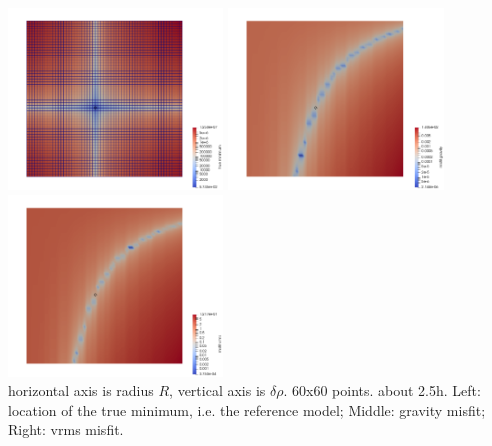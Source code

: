 \begin{center}
\includegraphics[width=5.7cm]{python_codes/fieldstone_114/results/min}
\includegraphics[width=5.7cm]{python_codes/fieldstone_114/results/mg}
\includegraphics[width=5.7cm]{python_codes/fieldstone_114/results/mv}\\
{\captionfont horizontal axis is radius $R$, vertical axis is $\delta\rho$. 60x60 points. about 2.5h.
Left: location of the true minimum, i.e. the reference model; Middle: gravity misfit; Right: vrms misfit.} 
\end{center}




